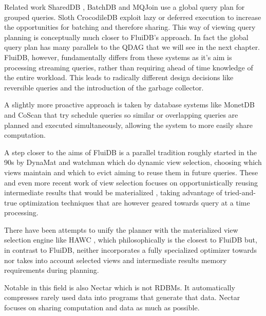 \begin{corrected}{Related work}
SharedDB \cite{giannikisSharedDBKillingOne2012}, BatchDB
\cite{makreshanskiBatchDBEfficientIsolated2017} and MQJoin
\cite{makreshanskiMqjoinEfficientShared2016a} use a global query plan
for grouped queries. Sloth \cite{cheungSlothBeingLazy2016} CrocodileDB
\cite{shangCrocodileDBEfficientDatabase2020} exploit lazy or deferred
execution to increase the opportunities for batching and therefore
sharing. This way of viewing query planning is conceptually much
closer to FluiDB's approach. In fact the global query plan has many
parallels to the QDAG that we will see in the next chapter. FluiDB,
however, fundamentally differs from these systems as it's aim is
processing streaming queries, rather than requiring ahead of time
knowledge of the entire workload. This leads to radically different
design decisions like reversible queries and the introduction of the
garbage collector.

A slightly more proactive approach is taken by database systems like
MonetDB \cite{idreosMonetdbTwoDecades2012} and CoScan
\cite{wangCoscanCooperativeScan2011} that try schedule queries so
similar or overlapping queries are planned and executed
simultaneously, allowing the system to more easily share computation.

A step closer to the aims of FluiDB is a parallel tradition roughly
started in the 90s by DynaMat \cite{kotidisDynamatDynamicView1999} and
watchman \cite{scheuermannWatchmanDataWarehouse1996} which do dynamic
view selection, choosing which views maintain and which to evict
aiming to reuse them in future queries. These and even more recent
work of view selection focuses on opportunistically reusing
intermediate results that would be materialized
\cite{ivanovaArchitectureRecyclingIntermediates2010,nagelRecyclingPipelinedQuery2013},
taking advantage of tried-and-true optimization techniques that are
however geared towards query at a time processing.

There have been attempts to unify the planner with the materialized
view selection engine like HAWC
\cite{perezHistoryawareQueryOptimization2014a}, which philosophically
is the closest to FluiDB but, in contrast to FluiDB, neither
incorporates a fully specialized optimizer towards nor takes into
account selected views and intermediate results memory requirements
during planning.

Notable in this field is also Nectar
\cite{gundaNectarAutomaticManagement2010} which is not RDBMs. It
automatically compresses rarely used data into programs that generate
that data. Nectar focuses on sharing computation and data as much as
possible.


\end{corrected}
